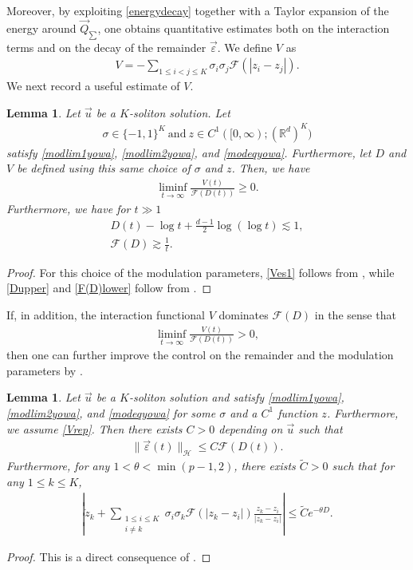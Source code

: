 \documentclass[10pt,a4paper]{amsart}
\newtheorem{lemma}[theorem]{Lemma}
\numberwithin{equation}{section}
\begin{document}
Moreover, by exploiting \eqref{energydecay} together with a Taylor expansion of the
energy around $\vec{Q}_{\sum}$, one obtains quantitative estimates both on the interaction terms and on the decay of the
remainder $\vec{\varepsilon}$. We define $V$ as 
\begin{align}\label{Vdef}
V=-\sum_{1\leq i<j\leq K}\sigma_i\sigma_j\mathcal{F}(|z_i-z_j|).
\end{align}
We next record a useful estimate of $V$.

\begin{lemma}\label{limeplem}
Let $\vec{u}$ be a $K$-soliton solution. Let 
\begin{align*}
\sigma\in\{-1,1\}^K\  \mbox{and}\  z\in C^1([0,\infty);(\mathbb{R}^d)^K)
\end{align*}
satisfy \eqref{modlim1yowa}, \eqref{modlim2yowa}, and \eqref{modeqyowa}. Furthermore, let $D$ and $V$ be defined using this same
choice of $\sigma$ and $z$. Then, we have
\begin{align}\label{Ves1}
\liminf_{t\to\infty} \frac{V(t)}{\mathcal{F}(D(t))}\geq 0.
\end{align}
Furthermore, we have for $t\gg 1$
\begin{align}
D(t)-\log{t}+\frac{d-1}{2}\log{(\log{t})}\lesssim1, \label{Dupper}
\\
\mathcal{F}(D)\gtrsim \frac{1}{t}. \label{F(D)lower}
\end{align}
\end{lemma}
\begin{proof}
For this choice of the modulation parameters, \eqref{Ves1} follows from \cite[Lemma 3.8]{I2}, while \eqref{Dupper} and \eqref{F(D)lower} follow from \cite[Lemma 3.9]{I2}.
\end{proof}
If, in addition, the interaction functional $V$ dominates $\mathcal{F}(D)$ in the sense that
\begin{align}\label{Vrep}
\liminf_{t\to \infty}\frac{V(t)}{\mathcal{F}(D(t))}> 0,
\end{align}
then one can further improve the control on the remainder and the modulation parameters by \cite[Lemma 3.11]{I2}.
\begin{lemma}\label{epzes}
Let $\vec{u}$ be a $K$-soliton solution and satisfy \eqref{modlim1yowa}, \eqref{modlim2yowa}, and \eqref{modeqyowa} for some $\sigma$ and a $C^1$ function $z$. Furthermore, we assume \eqref{Vrep}. Then there exists $C>0$ depending on $\vec{u}$ such that
\begin{align}\label{newepes}
\|\vec{\varepsilon}(t)\|_{\mathcal{H}}\leq C \mathcal{F}(D(t)).
\end{align}
Furthermore, for any $1<\theta<\min{(p-1,2)}$, there exists $\tilde{C}>0$ such that for any $1\leq k\leq K$,
\begin{align}\label{newzes}
\left|\dot{z}_k+\sum_{\substack{1\leq i\leq K\\ i\neq k}}\sigma_i\sigma_k\mathcal{F}(|z_k-z_i|)
\frac{z_k-z_i}{|z_k-z_i|}\right|
\leq \tilde{C} e^{-\theta D}.
\end{align}
\end{lemma}
\begin{proof}
This is a direct consequence of \cite[Lemma 3.11]{I2}.
\end{proof}
\end{document}
